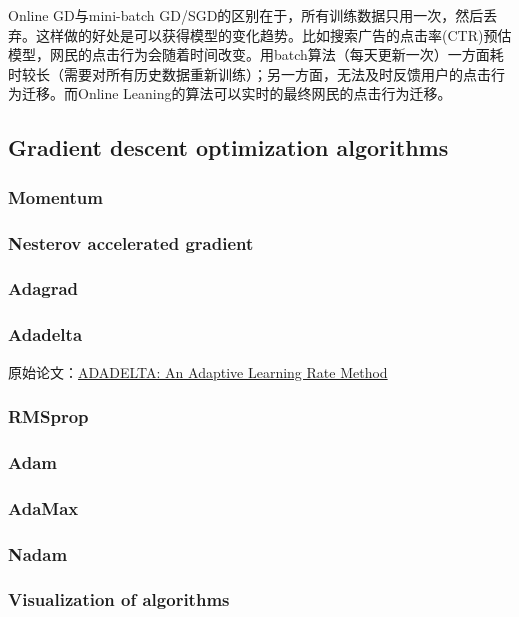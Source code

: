 \documentclass[a4paper,10pt]{ctexbook}
\begin{document}
Online GD与mini-batch GD/SGD的区别在于，所有训练数据只用一次，然后丢弃。这样做的好处是可以获得模型的变化趋势。比如搜索广告的点击率(CTR)预估模型，网民的点击行为会随着时间改变。用batch算法（每天更新一次）一方面耗时较长（需要对所有历史数据重新训练）；另一方面，无法及时反馈用户的点击行为迁移。而Online Leaning的算法可以实时的最终网民的点击行为迁移。


\subsection{Gradient descent optimization algorithms}
\subsubsection{Momentum}
\subsubsection{Nesterov accelerated gradient}
\subsubsection{Adagrad}




\subsubsection{Adadelta}
原始论文：\href{https://arxiv.org/abs/1212.5701}{ADADELTA: An Adaptive Learning Rate Method}






\subsubsection{RMSprop}
\subsubsection{Adam}
\subsubsection{AdaMax}
\subsubsection{Nadam}
\subsubsection{Visualization of algorithms}
\end{document}
